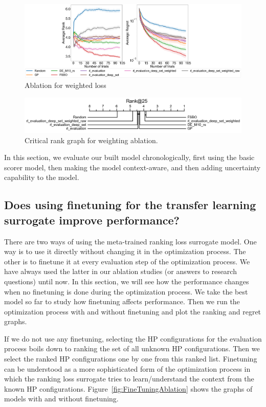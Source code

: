 \documentclass[12pt, twoside, ngerman]{report}
\begin{document}
\begin{figure}[h]
  \centering
    \includegraphics[scale=0.20]{images/RLDeepSetWeighted}
    \caption{Ablation for weighted loss}
    \label{fig:RLDeepSetWeighted}
\end{figure}

\begin{figure}[h]
  \centering
    \includegraphics[scale=0.35]{images/RLDeepSetWeightedRank25}
    \caption{Critical rank graph for weighting ablation.}
    \label{fig:RLDeepSetWeightedRank25}
\end{figure}

In this section, we evaluate our built model chronologically, first using the basic scorer model,  then making the model context-aware, and then adding uncertainty capability to the model.
\fi

\subsection{Does using finetuning for the transfer learning surrogate improve performance?}
\label{sec:EffectOfFineTuningResults}
There are two ways of using the meta-trained ranking loss surrogate model. One way is to use it directly without changing it in the optimization process. The other is to finetune it at every evaluation step of the optimization process. We have always used the latter in our ablation studies (or answers to research questions) until now.
In this section, we will see how the performance changes when no finetuning is done during the optimization process.
We take the best model so far to study how finetuning affects performance. Then we run the optimization process with and without finetuning and plot the ranking and regret graphs.

If we do not use any finetuning, selecting the HP configurations for the evaluation process boils down to ranking the set of all unknown HP configurations. Then we select the ranked HP configurations one by one from this ranked list. Finetuning can be understood as a more sophisticated form of the optimization process in which the ranking loss surrogate tries to learn/understand the context from the known HP configurations. Figure~\ref{fig:FineTuningAblation} shows the graphs of models with and without finetuning.
\end{document}
